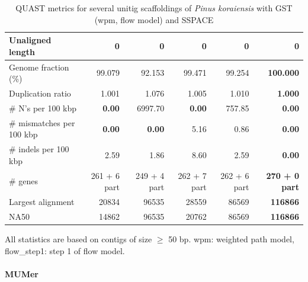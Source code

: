 \documentclass[12pt]{article}
\begin{document}
\begin{table}[h!]
\begin{center}
{\begin{tabular}{|l*{5}{|r}|}
Unaligned length & 0 & 0 & 0 & 0 & 0 \\ \hline
Genome fraction (\%) & 99.079 & 92.153 & 99.471 & 99.254 & {\bf 100.000} \\ \hline
Duplication ratio & 1.001 & 1.076 & 1.005 & 1.010 & {\bf 1.000} \\ \hline
\# N's per 100 kbp & {\bf 0.00} & 6997.70 & {\bf 0.00} & 757.85 & {\bf 0.00} \\ \hline
\# mismatches per 100 kbp & {\bf 0.00} & {\bf 0.00} & 5.16 & 0.86 & {\bf 0.00} \\ \hline
\# indels per 100 kbp & 2.59 & 1.86 & 8.60 & 2.59 & {\bf 0.00} \\ \hline
\# genes & 261 + 6 part & 249 + 4 part & 262 + 7 part & 262 + 6 part & {\bf 270 + 0 part} \\ \hline
Largest alignment & 20834 & 96535 & 28559 & 86569 & {\bf 116866} \\ \hline
NA50 & 14862 & 96535 & 20762 & 86569 & {\bf 116866} \\ \hline
\end{tabular}
}
\end{center}
\caption{QUAST metrics for several unitig scaffoldings of \textit{Pinus koraiensis} with GST (wpm, flow model) and SSPACE}
\footnotesize{All statistics are based on contigs of size $\geq$ 50 bp. {\color{magenta}wpm}: weighted path model, {\color{magenta}flow\_step1}: step 1 of flow model.}
\label{tab:pinus}
\end{table}
\newpage

\paragraph*{MUMer}
\end{document}
